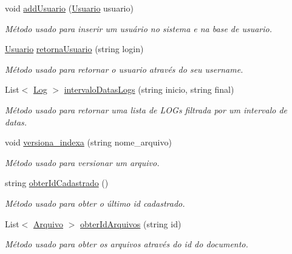 \begin{DoxyCompactItemize}
void \hyperlink{class_sistema_r_h_1_1_adaptador_ac9b891ce859599ead57c31b556d44aba}{addUsuario} (\hyperlink{class_sistema_r_h_1_1_usuario}{Usuario} usuario)
\begin{DoxyCompactList}\small\item\em Método usado para inserir um usuário no sistema e na base de usuario. \item\end{DoxyCompactList}\item 
\hyperlink{class_sistema_r_h_1_1_usuario}{Usuario} \hyperlink{class_sistema_r_h_1_1_adaptador_a801f81c172d67151cb9dd3f822c8ae21}{retornaUsuario} (string login)
\begin{DoxyCompactList}\small\item\em Método usado para retornar o usuario através do seu username. \item\end{DoxyCompactList}\item 
List$<$ \hyperlink{class_sistema_r_h_1_1_log}{Log} $>$ \hyperlink{class_sistema_r_h_1_1_adaptador_aa39a43568105b2092e82f49e41f3e9d1}{intervaloDatasLogs} (string inicio, string final)
\begin{DoxyCompactList}\small\item\em Método usado para retornar uma lista de LOGs filtrada por um intervalo de datas. \item\end{DoxyCompactList}\item 
void \hyperlink{class_sistema_r_h_1_1_adaptador_abc7e2f01b1d0afde19c2600fc6c76c05}{versiona\_\-indexa} (string nome\_\-arquivo)
\begin{DoxyCompactList}\small\item\em Método usado para versionar um arquivo. \item\end{DoxyCompactList}\item 
string \hyperlink{class_sistema_r_h_1_1_adaptador_a55a7011331026bd2220facd10a4c6be2}{obterIdCadastrado} ()
\begin{DoxyCompactList}\small\item\em Método usado para obter o último id cadastrado. \item\end{DoxyCompactList}\item 
List$<$ \hyperlink{class_sistema_r_h_1_1_arquivo}{Arquivo} $>$ \hyperlink{class_sistema_r_h_1_1_adaptador_af378e623c1a1227ecf8923e340c730ab}{obterIdArquivos} (string id)
\begin{DoxyCompactList}\small\item\em Método usado para obter os arquivos através do id do documento. \item\end{DoxyCompactList}\item 

\end{DoxyCompactItemize}
